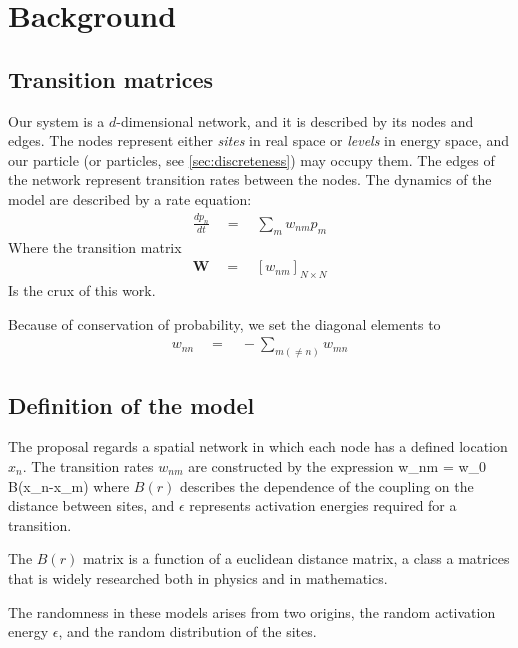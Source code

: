 \chapter{Background}

 
\section{Transition matrices}

Our system is a $d$-dimensional network, and it is
described by its nodes and edges. The nodes represent 
either {\em sites} in real space or {\em levels} in energy space, 
and our particle (or particles, see \ref{sec:discreteness}) may
occupy them. The edges of the network represent transition rates 
between the nodes. The dynamics of the model are described by 
a rate equation:
%
\begin{align}
\frac{dp_n}{dt} \quad = \quad \sum_m w_{nm}p_m
\end{align}
%
Where the transition matrix 
%
\begin{align}
\mathbf{W} \quad =  \quad \left[ w_{nm}\right]_{N\times N}
\end{align}
%
Is the crux of this work.

Because of conservation of probability, we set the diagonal
elements to
%
\begin{align}
w_{nn}\quad = \quad -\sum_{m(\ne n)} w_{mn}
\end{align}
%


\section{Definition of the model}


The proposal regards a spatial network in which each node
has a defined location $x_n$. The transition rates $w_{nm}$
are constructed by the expression
%
\beq
w_{nm} \quad = \quad w_0 B(x_n-x_m)
\eeq
%
where $B(r)$ describes the dependence of the coupling on the
distance between sites, and $\epsilon$ represents activation
energies required for a transition.


The $B(r)$ matrix is a function of a euclidean distance matrix,
a class a matrices that is widely researched 
\cite{skipetrov_eigenvalue_2011, goetschy_non-hermitian_2011,mezard_spectra_1999, bogomolny_spectral_2003}
both in physics and in mathematics.


The randomness in these models arises from two origins, 
the random activation energy $\epsilon$, and the random distribution of the sites.


